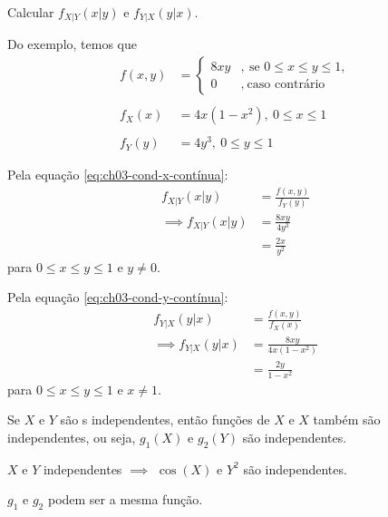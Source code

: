 \begin{example}
    Calcular $f_{X|Y}(x|y)$ e $f_{Y|X}(y|x)$.

    \bigskip
    Do exemplo, temos que
    \begin{align*}
        f(x, y) &= \begin{cases}
            8xy &,\ \text{se } 0 \le x \le y \le 1, \\
            0 &,\ \text{caso contrário}
        \end{cases} \\
        \\
        f_X(x) &= 4x(1 - x^2),\ 0 \le x \le 1 \\
        \\
        f_Y(y) &= 4y^3,\ 0 \le y \le 1
    \end{align*}
    
    Pela equação \cref{eq:ch03-cond-x-contínua}:
    \begin{align*}
        f_{X|Y}(x | y) &= \frac{f(x, y)}{f_Y(y)} \\
        \implies f_{X|Y}(x | y) &= \frac{8xy}{4y^3} \\
        &= \frac{2x}{y^2}
    \end{align*}
    para $0 \le x \le y \le 1$ e $y \ne 0$.

    Pela equação \cref{eq:ch03-cond-y-contínua}:
    \begin{align*}
        f_{Y|X}(y | x) &= \frac{f(x, y)}{f_X(x)} \\
        \implies f_{Y|X}(y | x) &= \frac{8xy}{4x(1 - x^2)} \\
        &= \frac{2y}{1 - x^2}
    \end{align*}
    para $0 \le x \le y \le 1$ e $x \ne 1$.
\end{example}

\begin{property}
    Se $X$ e $Y$ são \va s independentes, então funções de $X$ e $X$
    também são independentes, ou seja, $g_1(X)$ e $g_2(Y)$
    são independentes.
\end{property}

\begin{example}
    $X$ e $Y$ independentes $\implies$ $\cos(X)$ e $Y^2$ são independentes.
\end{example}

\begin{obs}
    $g_1$ e $g_2$ podem ser a mesma função.
\end{obs}

